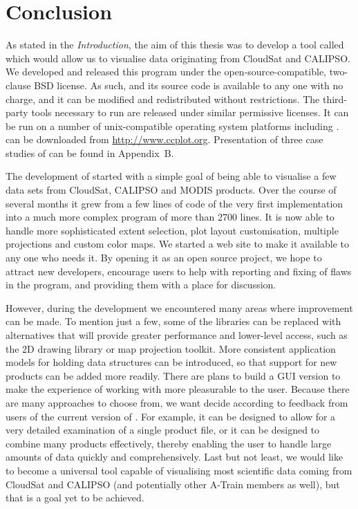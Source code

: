 \chapter{Conclusion}
As stated in the \textit{Introduction}, the aim of this thesis was to develop a tool called \ccplot
which would allow us to visualise data originating from CloudSat and CALIPSO.
We developed and released this program under the open-source-compatible, two-clause BSD license. As such,
\ccplot and its source code is available to any one with no charge, and
it can be modified and redistributed without restrictions. The third-party tools
necessary to run \ccplot are released under similar permissive licenses. It can
be run on a number of unix-compatible operating system platforms including
. \ccplot can be downloaded from \url{http://www.ccplot.org}.
Presentation of three case studies of \ccplot can be found in Appendix~B.

The development of \ccplot started with a simple goal of being able to
visualise a few data sets from CloudSat, CALIPSO and MODIS products. Over the course of several months it grew
from a few lines of code of the very first implementation into a much more
complex program of more than 2700 lines. It is now able to handle more
sophisticated extent selection, plot layout customisation, multiple projections
and custom color maps. We started a web site to make it available to any one who
needs it. By opening it as an open source project, we hope to
attract new developers, encourage users to help with reporting and fixing of
flaws in the program, and providing them with a place for discussion.

However, during the development we encountered many areas where improvement can
be made. To mention just a few, some of the libraries can be replaced with
alternatives that will provide greater performance and lower-level access, such as
the  2D drawing library or  map projection toolkit. More
consistent application models for holding data structures can be introduced, so
that support for new products can be added more readily.
There are plans to build a GUI version to make the experience of working with \ccplot more
pleasurable to the user. Because there are many approaches to choose from, we
want decide according to feedback from users of the current version of
\ccplot. For example, it can be designed to allow for a very detailed examination
of a single product file, or it can be designed to combine many products effectively,
thereby enabling the user to handle large amounts of data quickly and comprehensively.
Last but not least, we would like \ccplot to become a universal tool capable
of visualising most scientific data coming from CloudSat and CALIPSO (and
potentially other A-Train members as well), but that is a goal yet to be
achieved.

